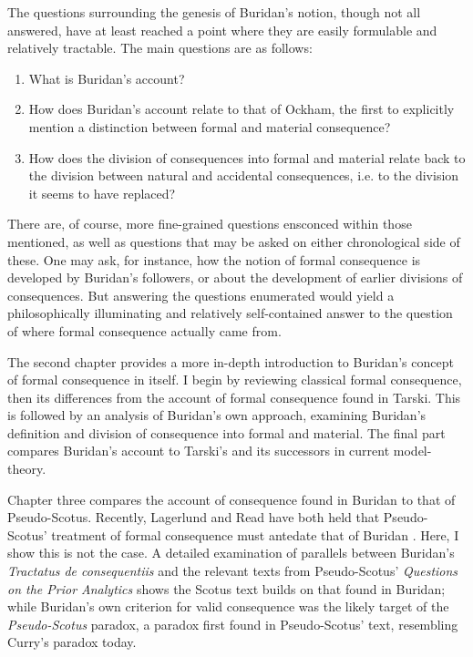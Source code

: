 \documentclass[]{article}
\begin{document}
The questions surrounding the genesis of Buridan's notion, though not all answered, have at least reached a point where they are easily formulable and relatively tractable. The main questions are as follows: 
\begin{enumerate}
	\item What is Buridan's account?
	\item How does Buridan's account relate to that of Ockham, the first to explicitly mention a distinction between formal and material consequence?
	\item How does the division of consequences into formal and material relate back to the division between natural and accidental consequences, i.e. to the division it seems to have replaced?
\end{enumerate}
There are, of course, more fine-grained questions ensconced within those mentioned, as well as questions that may be asked on either chronological side of these. One may ask, for instance, how the notion of formal consequence is developed by Buridan's followers, or about the development of earlier divisions of consequences. But answering the questions enumerated would yield a philosophically illuminating and relatively self-contained answer to the question of where formal consequence actually came from.

The second chapter provides a more in-depth introduction to Buridan's concept of formal consequence in itself. I begin by reviewing classical formal consequence, then its differences from the account of formal consequence found in Tarski. This is followed by an analysis of Buridan's own approach, examining Buridan's definition and division of consequence into formal and material. The final part compares Buridan's account to Tarski's and its successors in current model-theory. 

Chapter three compares the account of consequence found in Buridan to that of Pseudo-Scotus. Recently, Lagerlund and Read have both held that Pseudo-Scotus' treatment of formal consequence must antedate that of Buridan \cite{Lagerlund2000} \cite{Read2015}. Here, I show this is not the case. A detailed examination of parallels between Buridan's \textit{Tractatus de consequentiis} and the relevant texts from Pseudo-Scotus' \textit{Questions on the Prior Analytics} shows the Scotus text builds on that found in Buridan; while Buridan's own criterion for valid consequence was the likely target of the \textit{Pseudo-Scotus} paradox, a paradox first found in Pseudo-Scotus' text, resembling Curry's paradox today.
\end{document}
